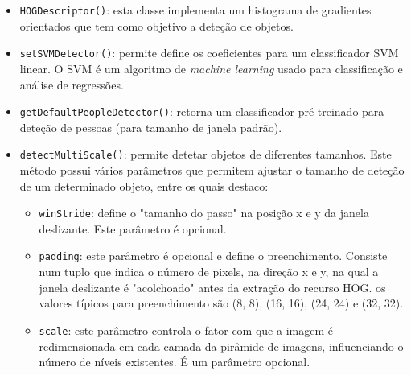 \begin{itemize}
	\item \texttt{HOGDescriptor()}: esta classe implementa um histograma de gradientes orientados\cite{Dalal} que tem como objetivo a deteção de objetos.
	
	\item \texttt{setSVMDetector()}: permite define os coeficientes para um  classificador \ac{SVM} linear. O \ac{SVM} é um algoritmo de \textit{machine learning} usado para classificação e análise de regressões. 
	
	
	\item \texttt{getDefaultPeopleDetector()}: retorna um classificador pré-treinado para deteção de pessoas (para tamanho de janela padrão)\cite{featuredetection}. 
	
	
	\item \texttt{detectMultiScale()}: permite detetar objetos de diferentes tamanhos. Este método possui vários parâmetros que permitem ajustar o tamanho de deteção de um determinado objeto, entre os quais destaco: 
	
\begin{itemize}
	\item \texttt{winStride}: define o "tamanho do passo" na posição x e y da janela deslizante. Este parâmetro é opcional.
	 
	\item \texttt{padding}: este parâmetro é opcional e define o preenchimento. Consiste num tuplo que indica o número de pixels, na direção x e y, na qual a janela deslizante é "acolchoado" antes da extração do recurso HOG. os valores típicos para preenchimento são (8, 8),  (16, 16), (24, 24) e (32, 32).
	
	\item \texttt{scale}: este parâmetro controla o fator com que a imagem é redimensionada em cada camada da pirâmide de imagens, influenciando o número de níveis existentes. É um parâmetro opcional. 



\end{itemize}
\end{itemize}
